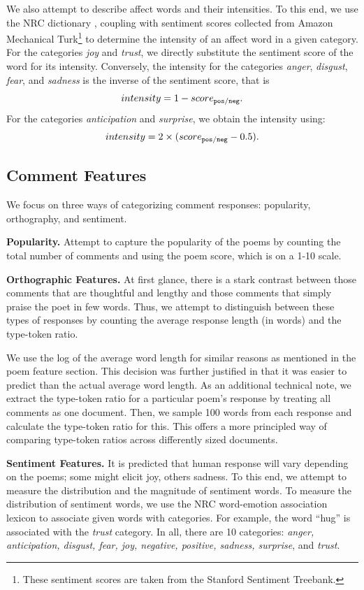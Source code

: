 \documentclass[11pt]{article}
\newcommand{\slimparagraph}[1]{
\vspace{4pt} %
\textbf{#1.}\quad}
\begin{document}
We also attempt to describe affect words and their intensities. To this end, we use the NRC dictionary \cite{mohammad2010emotions}, coupling with sentiment scores collected from Amazon Mechanical Turk\footnote{These sentiment scores are taken from the Stanford Sentiment Treebank.} to determine the intensity of an affect word in a given category. For the categories \emph{joy} and \emph{trust}, we directly substitute the sentiment score of the word for its intensity. Conversely, the intensity for the categories \emph{anger},
\emph{disgust},
\emph{fear}, and
\emph{sadness} is the inverse of the sentiment score, that is
$$intensity = 1 - score_{\tt pos/neg}.$$
For the categories \emph{anticipation} and \emph{surprise}, we obtain the intensity using:
$$intensity = 2 \times ( score_{\tt pos/neg} - 0.5 ).$$



\subsection{Comment Features}
We focus on three ways of categorizing comment responses: popularity, orthography, and sentiment.

\slimparagraph{Popularity}
Attempt to capture the popularity of the poems by counting the total number of comments and using the poem score, which is on a 1-10 scale.

\slimparagraph{Orthographic Features}
At first glance, there is a stark contrast between those comments that are thoughtful and lengthy and those comments that simply praise the poet in few words. Thus, we attempt to distinguish between these types of responses by counting the average response length (in words) and the type-token ratio. 

We use the log of the average word length for similar reasons as mentioned in the poem feature section. This decision was further justified in that it was easier to predict than the actual average word length. As an additional technical note, we extract the type-token ratio for a particular poem's response by treating all comments as one document. Then, we sample 100 words from each response and calculate the type-token ratio for this. This offers a more principled way of comparing type-token ratios across differently sized documents.

\slimparagraph{Sentiment Features}
It is predicted that human response will vary depending on the poems; some might elicit joy, others sadness. To this end, we attempt to measure the distribution and the magnitude of sentiment words. To measure the distribution of sentiment words, we use the NRC word-emotion association lexicon \cite{mohammad2010emotions} to associate given words with categories. For example, the word ``hug'' is associated with the \emph{trust} category. In all, there are 10 categories: \emph{anger, anticipation, disgust, fear, joy, negative, positive, sadness, surprise}, and \emph{trust}.
\end{document}
